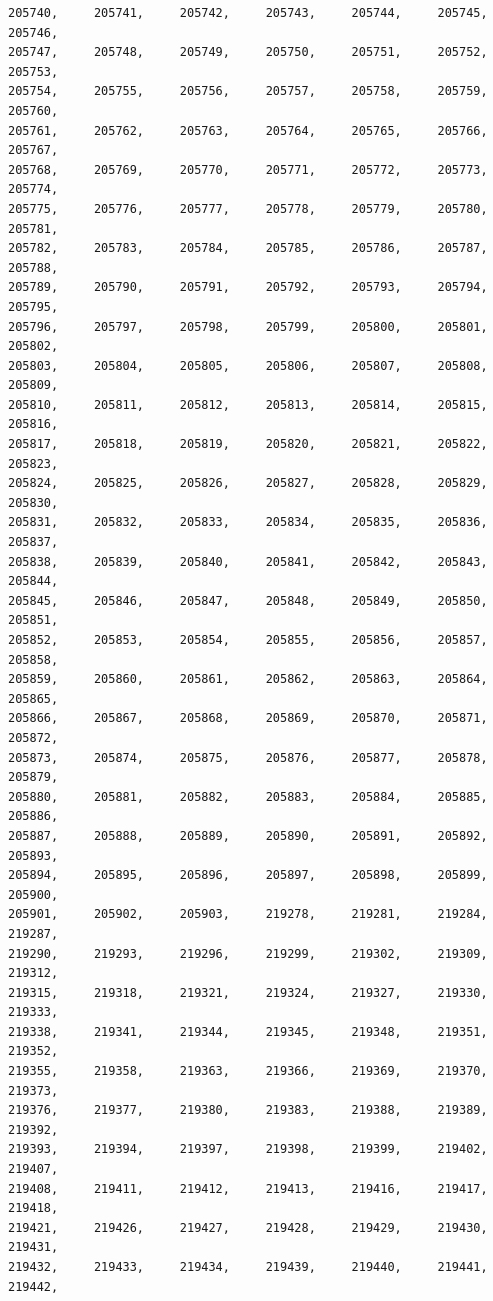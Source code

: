 \documentclass[a4paper,11pt]{report}
\begin{document}
\begin{verbatim}
205740,     205741,     205742,     205743,     205744,     205745,     205746,
205747,     205748,     205749,     205750,     205751,     205752,     205753,
205754,     205755,     205756,     205757,     205758,     205759,     205760,
205761,     205762,     205763,     205764,     205765,     205766,     205767,
205768,     205769,     205770,     205771,     205772,     205773,     205774,
205775,     205776,     205777,     205778,     205779,     205780,     205781,
205782,     205783,     205784,     205785,     205786,     205787,     205788,
205789,     205790,     205791,     205792,     205793,     205794,     205795,
205796,     205797,     205798,     205799,     205800,     205801,     205802,
205803,     205804,     205805,     205806,     205807,     205808,     205809,
205810,     205811,     205812,     205813,     205814,     205815,     205816,
205817,     205818,     205819,     205820,     205821,     205822,     205823,
205824,     205825,     205826,     205827,     205828,     205829,     205830,
205831,     205832,     205833,     205834,     205835,     205836,     205837,
205838,     205839,     205840,     205841,     205842,     205843,     205844,
205845,     205846,     205847,     205848,     205849,     205850,     205851,
205852,     205853,     205854,     205855,     205856,     205857,     205858,
205859,     205860,     205861,     205862,     205863,     205864,     205865,
205866,     205867,     205868,     205869,     205870,     205871,     205872,
205873,     205874,     205875,     205876,     205877,     205878,     205879,
205880,     205881,     205882,     205883,     205884,     205885,     205886,
205887,     205888,     205889,     205890,     205891,     205892,     205893,
205894,     205895,     205896,     205897,     205898,     205899,     205900,
205901,     205902,     205903,     219278,     219281,     219284,     219287,
219290,     219293,     219296,     219299,     219302,     219309,     219312,
219315,     219318,     219321,     219324,     219327,     219330,     219333,
219338,     219341,     219344,     219345,     219348,     219351,     219352,
219355,     219358,     219363,     219366,     219369,     219370,     219373,
219376,     219377,     219380,     219383,     219388,     219389,     219392,
219393,     219394,     219397,     219398,     219399,     219402,     219407,
219408,     219411,     219412,     219413,     219416,     219417,     219418,
219421,     219426,     219427,     219428,     219429,     219430,     219431,
219432,     219433,     219434,     219439,     219440,     219441,     219442,

\end{verbatim}
\end{document}
